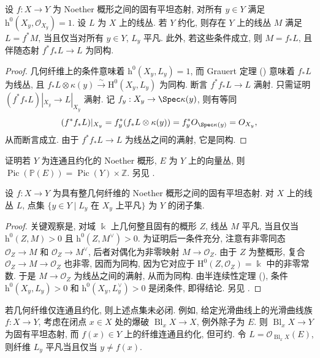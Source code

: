 \begin{proposition}[版本 $1$]\label{src:A.6.14}
设 $f:X\to Y$ 为 Noether 概形之间的固有平坦态射, 对所有 $y\in Y$ 满足 $\mathrm h^0(X_y,\mathcal O_{X_y})=1$. 设 $L$ 为 $X$ 上的线丛. 若 $Y$ 约化, 则存在 $Y$ 上的线丛 $M$ 满足 $L=f^*M$, 当且仅当对所有 $y\in Y$, $L_y$ 平凡. 此外, 若这些条件成立, 则 $M=f_*L$, 且伴随态射 $f^*f_*L\to L$ 为同构.
\end{proposition}
\begin{proof}
几何纤维上的条件意味着 $\mathrm h^0(X_y,L_y)=1$, 而 Grauert 定理 () 意味着 $f_*L$ 为线丛, 且 $f_*L\otimes\kappa(y)\xrightarrow{\sim}\mathrm H^0(X_y,L_y)$ 为同构. 断言 $f^*f_*L\to L$ 满射. 只需证明 $(f^*f_*L)|_{X_y}\to L|_{X_y}$ 满射. 记 $f_y:X_y\to\Spec\kappa(y)$, 则有等同
\[
(f^*f_*L)|_{X_y}=f_y^*(f_*L\otimes\kappa(y))=f_y^*\mathcal O_{\Spec\kappa(y)}=\mathcal O_{X_y},
\]
从而断言成立. 由于 $f^*f_*L\to L$ 为线丛之间的满射, 它是同构.
\end{proof}
\begin{exercise}\label{src:A.6.15}
证明若 $Y$ 为连通且约化的 Noether 概形, $E$ 为 $Y$ 上的向量丛, 则 $\operatorname{Pic}(\mathbb P(E))=\operatorname{Pic}(Y)\times\mathbb Z$. 另见 \cite[习题 III.$12.5$]{Har77}.
\end{exercise}
\begin{proposition}[版本 $2$]\label{src:A.6.16}
设 $f:X\to Y$ 为具有整几何纤维的 Noether 概形之间的固有平坦态射. 对 $X$ 上的线丛 $L$, 点集 $\{y\in Y\mid L_y\text{ 在 }X_y\text{ 上平凡}\}$ 为 $Y$ 的闭子集.
\end{proposition}
\begin{proof}
关键观察是, 对域 $\Bbbk$ 上几何整且固有的概形 $Z$, 线丛 $M$ 平凡, 当且仅当 $\mathrm h^0(Z,M)>0$ 且 $\mathrm h^0(Z,M^\vee)>0$. 为证明后一条件充分, 注意有非零同态 $\mathcal O_Z\to M$ 和 $\mathcal O_Z\to M^\vee$, 后者对偶化为非零映射 $M\to\mathcal O_Z$. 由于 $Z$ 为整概形, 复合 $\mathcal O_Z\to M\to\mathcal O_Z$ 也非零, 因而为同构, 因为它对应于 $\mathrm H^0(Z,\mathcal O_Z)=\Bbbk$ 中的非零常数. 于是 $M\to\mathcal O_Z$ 为线丛之间的满射, 从而为同构. 由半连续性定理 (), 条件 $\mathrm h^0(X_y,L_y)>0$ 和 $\mathrm h^0(X_y,L_y^\vee)>0$ 是闭条件, 即得结论. 另见 \cite[推论 $6$, 第 $54$ 页]{Mum70a}.
\end{proof}
\begin{remark}\label{src:A.6.17}
若几何纤维仅连通且约化, 则上述点集未必闭. 例如, 给定光滑曲线上的光滑曲线族 $f:X\to Y$, 考虑在闭点 $x\in X$ 处的爆破 $\operatorname{Bl}_xX\to X$, 例外除子为 $E$. 则 $\operatorname{Bl}_xX\to Y$ 为固有平坦态射, 而 $f(x)\in Y$ 上的纤维连通且约化, 但可约. 令 $L=\mathcal O_{\operatorname{Bl}_xX}(E)$, 则纤维 $L_y$ 平凡当且仅当 $y\neq f(x)$.
\end{remark}
